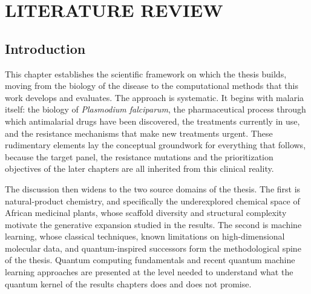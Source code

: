 \chapter{LITERATURE REVIEW}
\label{Chap:1}
\adjustmtc[3]
\begin{tcolorbox}[beamer,breakable,top=1mm,bottom=1mm,boxsep=0.5mm]
	\begingroup
	\renewcommand{\mtcfont}{\footnotesize\rmfamily\upshape\mdseries}%
	\renewcommand{\mtcSfont}{\footnotesize\rmfamily\upshape\bfseries}%
	\let\mtcSSfont\mtcfont \let\mtcSSSfont\mtcfont
	\minitoc
	\endgroup
\end{tcolorbox}

\newpage

\section{Introduction}\label{sec:ch1_intro}

This chapter establishes the scientific framework on which the thesis builds, moving from the biology of the disease to the computational methods that this work develops and evaluates. The approach is systematic. It begins with malaria itself: the biology of \emph{Plasmodium falciparum}, the pharmaceutical process through which antimalarial drugs have been discovered, the treatments currently in use, and the resistance mechanisms that make new treatments urgent. These rudimentary elements lay the conceptual groundwork for everything that follows, because the target panel, the resistance mutations and the prioritization objectives of the later chapters are all inherited from this clinical reality.

The discussion then widens to the two source domains of the thesis. The first is natural-product chemistry, and specifically the underexplored chemical space of African medicinal plants, whose scaffold diversity and structural complexity motivate the generative expansion studied in the results. The second is machine learning, whose classical techniques, known limitations on high-dimensional molecular data, and quantum-inspired successors form the methodological spine of the thesis. Quantum computing fundamentals and recent quantum machine learning approaches are presented at the level needed to understand what the quantum kernel of the results chapters does and does not promise.

